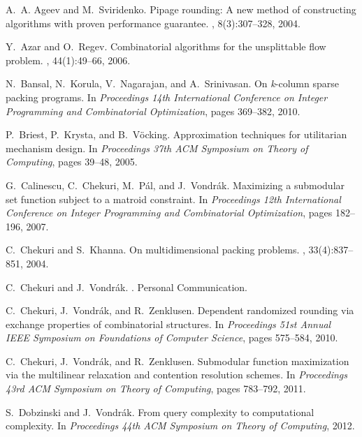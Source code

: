 \documentclass[11pt]{article}
\theoremstyle{plain}
\theoremstyle{definition}
\begin{document}
\begin{thebibliography}{10}

A.~A. Ageev and M.~Sviridenko.
\newblock Pipage rounding: A new method of constructing algorithms with proven
  performance guarantee.
, 8(3):307--328, 2004.

Y.~Azar and O.~Regev.
\newblock Combinatorial algorithms for the unsplittable flow problem.
, 44(1):49--66, 2006.

N.~Bansal, N.~Korula, V.~Nagarajan, and A.~Srinivasan.
\newblock On {\it k}-column sparse packing programs.
\newblock In {\em Proceedings 14th International Conference on Integer
  Programming and Combinatorial Optimization}, pages 369--382, 2010.

P.~Briest, P.~Krysta, and B.~V{\"o}cking.
\newblock Approximation techniques for utilitarian mechanism design.
\newblock In {\em Proceedings 37th ACM Symposium on Theory of Computing}, pages
  39--48, 2005.

G.~Calinescu, C.~Chekuri, M.~P{\'a}l, and J.~Vondr{\'a}k.
\newblock Maximizing a submodular set function subject to a matroid constraint.
\newblock In {\em Proceedings 12th International Conference on Integer
  Programming and Combinatorial Optimization}, pages 182--196, 2007.

C.~Chekuri and S.~Khanna.
\newblock On multidimensional packing problems.
, 33(4):837--851, 2004.

C.~Chekuri and J.~Vondr{\'a}k.
.
\newblock Personal Communication.

C.~Chekuri, J.~Vondr{\'a}k, and R.~Zenklusen.
\newblock Dependent randomized rounding via exchange properties of
  combinatorial structures.
\newblock In {\em Proceedings 51st Annual IEEE Symposium on Foundations of
  Computer Science}, pages 575--584, 2010.

C.~Chekuri, J.~Vondr{\'a}k, and R.~Zenklusen.
\newblock Submodular function maximization via the multilinear relaxation and
  contention resolution schemes.
\newblock In {\em Proceedings 43rd ACM Symposium on Theory of Computing}, pages
  783--792, 2011.

S.~Dobzinski and J.~Vondr{\'a}k.
\newblock From query complexity to computational complexity.
\newblock In {\em Proceedings 44th ACM Symposium on Theory of Computing}, 2012.


\end{thebibliography}
\end{document}

